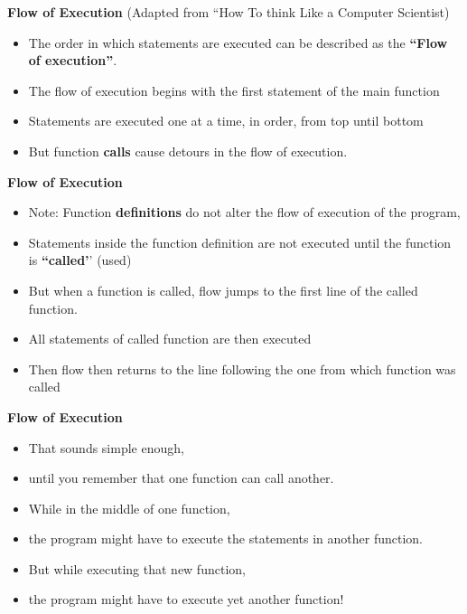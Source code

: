 \documentclass{beamer}
\begin{document}
\begin{frame}
\textbf{ Flow of Execution} (Adapted from ``How To think Like a Computer Scientist)
\begin{itemize}
\item The order in which statements are executed can be described as the \textbf{``Flow of execution''}.
\item The flow of execution begins with the first statement of the main function
\item Statements are executed one at a time, in order, from top until bottom
\item But function \textbf{calls} cause detours in the flow of execution. 
\end{itemize}
\end{frame}

\begin{frame}
\textbf{ Flow of Execution}
\begin{itemize}
\item Note: Function \textbf{definitions} do not alter the flow of execution of the program, 
\item Statements inside the function definition are not executed until the function is \textbf{``called'}' (used)
\item But when a function is called, flow jumps to the first line of the called function. 
\item All statements of called function are then executed 
\item Then flow then returns to the line following the one from which function was called
\end{itemize}
\end{frame}

\begin{frame}
\textbf{ Flow of Execution}
\begin{itemize}
\item That sounds simple enough, 
\item until you remember that one function can call another. 
\item While in the middle of one function, 
\item the program might have to execute the statements in another function. 
\item But while executing that new function, 
\item the program might have to execute yet another function!
\end{itemize}
\end{frame}
\end{document}

